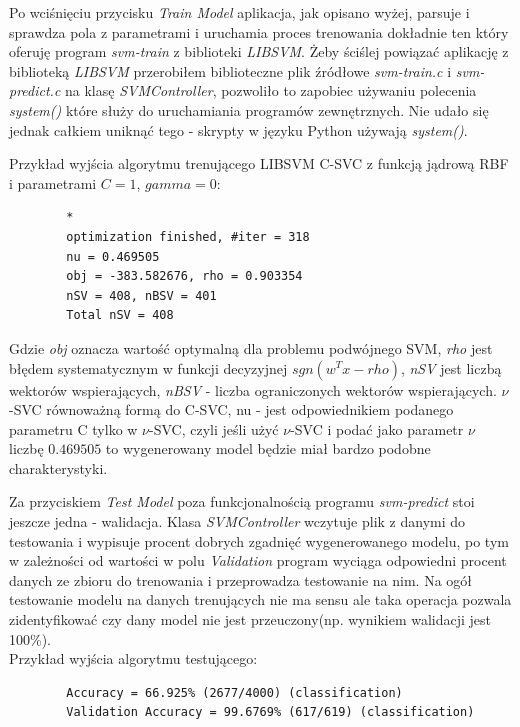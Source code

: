 \documentclass[paper=a4, fontsize=11pt]{scrartcl} %
\numberwithin{equation}{section} %
\numberwithin{figure}{section} %
\begin{document}
    \par Po wciśnięciu przycisku \textit{Train Model} aplikacja, jak opisano wyżej,
    parsuje i sprawdza pola z parametrami i uruchamia proces trenowania dokładnie ten który
    oferuję program \textit{svm-train} z biblioteki \textit{LIBSVM}. Żeby ściślej powiązać
    aplikację z biblioteką \textit{LIBSVM} przerobiłem biblioteczne plik źródłowe
    \textit{svm-train.c} i \textit{svm-predict.c} na klasę \textit{SVMController}, pozwoliło to
    zapobiec używaniu polecenia \textit{system()} które służy do uruchamiania programów
    zewnętrznych. Nie udało się jednak całkiem uniknąć tego - skrypty w języku Python używają
    \textit{system()}.

    Przykład wyjścia algorytmu trenującego LIBSVM C-SVC z funkcją jądrową RBF i parametrami
    $C=1$, $gamma=0$:

    \begin{verbatim}
        *
        optimization finished, #iter = 318
        nu = 0.469505
        obj = -383.582676, rho = 0.903354
        nSV = 408, nBSV = 401
        Total nSV = 408
    \end{verbatim}

    \par Gdzie \textit{obj} oznacza wartość optymalną dla problemu podwójnego SVM, \textit{rho}
    jest błędem systematycznym w funkcji decyzyjnej $sgn(w^{T}x - rho)$, \textit{nSV} jest
    liczbą wektorów wspierających, \textit{nBSV} - liczba ograniczonych  wektorów
    wspierających. $\nu$-SVC równoważną formą do C-SVC, nu - jest odpowiednikiem podanego
    parametru C tylko w $\nu$-SVC, czyli jeśli użyć $\nu$-SVC i podać jako parametr $\nu$
    liczbę $0.469505$ to wygenerowany model będzie miał bardzo podobne charakterystyki.

    \par Za przyciskiem \textit{Test Model} poza funkcjonalnością programu \textit{svm-predict}
    stoi jeszcze jedna - walidacja. Klasa \textit{SVMController} wczytuje plik z danymi do
    testowania i wypisuje procent dobrych zgadnięć wygenerowanego modelu, po tym w zależności
    od wartości w polu \textit{Validation} program wyciąga odpowiedni procent danych ze zbioru
    do trenowania i przeprowadza testowanie na nim. Na ogół testowanie modelu na danych
    trenujących nie ma sensu ale taka operacja pozwala zidentyfikować czy dany model nie jest
    przeuczony(np. wynikiem walidacji jest 100\%). \\

    Przykład wyjścia algorytmu testującego:
    \begin{verbatim}
        Accuracy = 66.925% (2677/4000) (classification)
        Validation Accuracy = 99.6769% (617/619) (classification)
    \end{verbatim}
\end{document}
